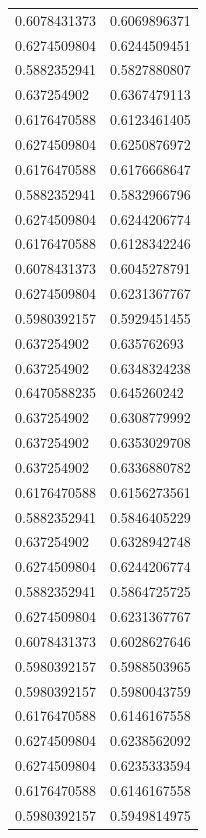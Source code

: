 \begin{longtable}{@{}ll@{}}
		0.6078431373 & 0.6069896371 \\
		0.6274509804 & 0.6244509451 \\
		0.5882352941 & 0.5827880807 \\
		0.637254902  & 0.6367479113 \\
		0.6176470588 & 0.6123461405 \\
		0.6274509804 & 0.6250876972 \\
		0.6176470588 & 0.6176668647 \\
		0.5882352941 & 0.5832966796 \\
		0.6274509804 & 0.6244206774 \\
		0.6176470588 & 0.6128342246 \\
		0.6078431373 & 0.6045278791 \\
		0.6274509804 & 0.6231367767 \\
		0.5980392157 & 0.5929451455 \\
		0.637254902  & 0.635762693  \\
		0.637254902  & 0.6348324238 \\
		0.6470588235 & 0.645260242  \\
		0.637254902  & 0.6308779992 \\
		0.637254902  & 0.6353029708 \\
		0.637254902  & 0.6336880782 \\
		0.6176470588 & 0.6156273561 \\
		0.5882352941 & 0.5846405229 \\
		0.637254902  & 0.6328942748 \\
		0.6274509804 & 0.6244206774 \\
		0.5882352941 & 0.5864725725 \\
		0.6274509804 & 0.6231367767 \\
		0.6078431373 & 0.6028627646 \\
		0.5980392157 & 0.5988503965 \\
		0.5980392157 & 0.5980043759 \\
		0.6176470588 & 0.6146167558 \\
		0.6274509804 & 0.6238562092 \\
		0.6274509804 & 0.6235333594 \\
		0.6176470588 & 0.6146167558 \\
		0.5980392157 & 0.5949814975 \\ \bottomrule
\end{longtable}

